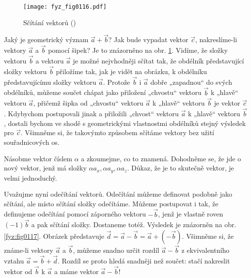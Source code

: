     \begin{figure}[ht!]  %
      \centering
      \texttt{[image: fyz\_fig0116.pdf]}
      \caption{Sčítání vektorů
              (\cite[s.~160]{Feynman01})}
      \label{fyz:fig0116}
    \end{figure}
    Jaký je geometrický význam \(\vec{a} + \vec{b}\)? Jak bude vypadat vektor \(\vec{c}\), 
    nakreslíme-li vektory \(\vec{a}\) a \(\vec{b}\) pomocí šipek? Je to znázorněno na obr. 
    \ref{fyz:fig0116}. Vidíme, že složky vektoru \(\vec{b}\) a vektoru \(\vec{a}\) je možné 
    nejvhodněji sčítat tak, že obdélník představující složky vektoru \(\vec{b}\) přiložíme tak, jak 
    je vidět na obrázku, k obdélníku představujícímu složky vektoru \(\vec{a}\). Protože 
    \(\vec{b}\) i \(\vec{a}\) dobře „zapadnou“ do svých obdélníků, můžeme součet chápat jako 
    přiložení „chvostu“ vektoru \(\vec{b}\) k „hlavě“ vektoru \(\vec{a}\), přičemž šipka od 
    „chvostu“ vektoru \(\vec{a}\) k „hlavě“ vektoru \(\vec{b}\) je vektor \(\vec{c}\). Kdybychom 
    postupovali jinak a přiložili „chvost“ vektoru \(\vec{a}\) k „hlavě“ vektoru \(\vec{b}\), 
    dostali bychom ve shodě s geometrickými vlastnostmi obdélníků stejný výsledek pro \(\vec{c}\). 
    Všimněme si, že takovýmto způsobem sčítáme vektory bez užití souřadnicových os.
    
    Násobme vektor číslem \(\alpha\) a zkoumejme, co to znamená. Dohodněme se, že jde o nový 
    vektor, jenž má složky \(\alpha a_x, \alpha a_y, \alpha a_z\). Důkaz, že je to skutečně vektor, 
    je velmi jednoduchý.
    
    Uvažujme nyní odečítání vektorů. Odečítání můžeme definovat podobně jako sčítání, ale místo 
    sčítání složky odečítáme. Můžeme postupovat i tak, že definujeme odečítání pomocí záporného 
    vektoru \(-\vec{b}\), jenž je vlastně roven \((-1)\vec{b}\) a pak sčítání složky. Dostaneme 
    totéž. Výsledek je znázorněn na obr. \ref{fyz:fig0117}. Obrázek představuje \(\vec{d} = \vec{a} 
    - \vec{b} = \vec{a} + (-\vec{b})\). Všimněme si, že známe-li vektory \(\vec{a}\) a \(\vec{b}\), 
    můžeme snadno určit rozdíl \(\vec{a} - \vec{b}\) z ekvivalentního vztahu \(\vec{a} = \vec{b} + 
    \vec{d}\). Rozdíl se proto hledá snadněji než součet: stačí nakreslit vektor od \(\vec{b}\) k 
    \(\vec{a}\) a máme vektor \(\vec{a} - \vec{b}\)!
    

